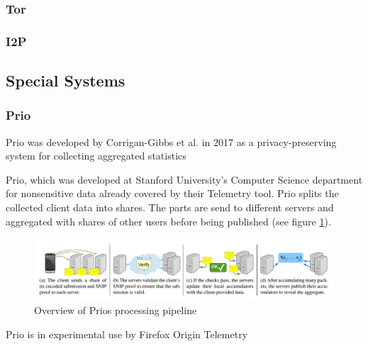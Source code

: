 \subsubsection{Tor}

\subsubsection{I2P}

%
%
\subsection{Special Systems}
\label{subsec:related:special}
%
\subsubsection{Prio}
    Prio was developed by Corrigan-Gibbs et al.\cite{corrigan-gibbs_prio_2017} in 2017 as a privacy-preserving
    system for collecting aggregated statistics
    
    Prio\cite{corrigan-gibbs_prio_2017}, which was developed at Stanford University's Computer Science department for nonsensitive data already covered by their Telemetry tool. Prio splits the collected client data into shares. The parts are send to different servers and aggregated with shares of other users before being published (see figure \ref{fig:prio_overview})\cite{corrigan-gibbs_prio_2017}.\\
    \begin{figure}
        \centering
        \includegraphics[width=\textwidth]{latex/figures/prio_overview.jpg}
        \caption{Overview of Prios processing pipeline\cite{corrigan-gibbs_prio_2017}}
        \label{fig:prio_overview}
    \end{figure}
    
    Prio is in experimental use by Firefox Origin Telemetry\\

